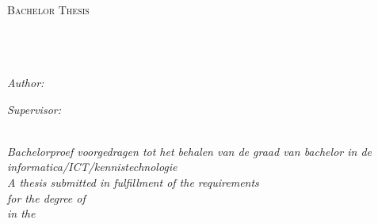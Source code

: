 \documentclass[
11pt, %
english, %
singlespacing, %
headsepline, %
]{MastersDoctoralThesis} %
\author{Axel \textsc{Faes}} %
\begin{document}
\frontmatter %

\pagestyle{plain} %


\begin{titlepage}
\begin{center}

\textsc{\LARGE \univname}\\[1.5cm] %

\textsc{\Large Bachelor Thesis}\\[0.5cm] %

\HRule \\[0.4cm] %
{\huge \bfseries \ttitle}\\[0.4cm] %
\HRule \\[1.5cm] %
 
\begin{minipage}{0.4\textwidth}
\begin{flushleft} \large
\emph{Author:}\\
{\authorname} %
\end{flushleft}
\end{minipage}
\begin{minipage}{0.4\textwidth}
\begin{flushright} \large
\emph{Supervisor:} \\
{\supname} %
\end{flushright}
\end{minipage}\\[1.5cm]
 
\large \textit{Bachelorproef voorgedragen tot het behalen van de graad van bachelor in de informatica/ICT/kennistechnologie}\\[0.3cm]
\large \textit{A thesis submitted in fulfillment of the requirements\\ for the degree of \degreename}\\[0.3cm] %
\textit{in the}\\[0.4cm]
\groupname\\\deptname\\[1.5cm] %
 

\end{center}
\end{titlepage}
\end{document}
